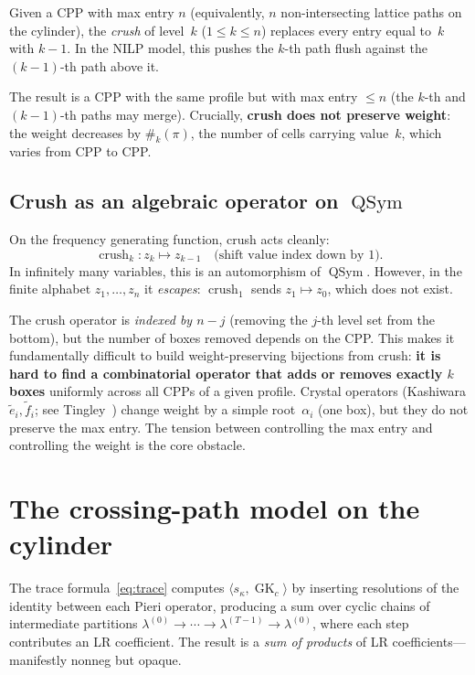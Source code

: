 \documentclass[11pt]{article}
\theoremstyle{plain}
\theoremstyle{definition}
\theoremstyle{remark}
\newcommand{\GK}{\operatorname{GK}}
\newcommand{\QSym}{\operatorname{QSym}}
\begin{document}
Given a CPP with max entry $n$ (equivalently, $n$ non-intersecting
lattice paths on the cylinder), the \emph{crush} of level~$k$
($1 \leq k \leq n$) replaces every entry equal to~$k$ with $k-1$.
In the NILP model, this pushes the $k$-th path flush against
the $(k-1)$-th path above it.

The result is a CPP with the same profile but with max entry
$\leq n$ (the $k$-th and $(k-1)$-th paths may merge).
Crucially, \textbf{crush does not preserve weight}: the weight
decreases by $\#_k(\pi)$, the number of cells carrying value~$k$,
which varies from CPP to CPP.

\subsection{Crush as an algebraic operator on $\QSym$}

On the frequency generating function, crush acts cleanly:
\[
  \operatorname{crush}_k : z_k \mapsto z_{k-1}
  \quad\text{(shift value index down by 1)}.
\]
In infinitely many variables, this is an automorphism of $\QSym$.
However, in the finite alphabet $z_1, \ldots, z_n$ it
\emph{escapes}: $\operatorname{crush}_1$ sends $z_1 \mapsto z_0$,
which does not exist.

The crush operator is \emph{indexed by $n - j$} (removing
the $j$-th level set from the bottom), but the number of boxes
removed depends on the CPP. This makes it fundamentally
difficult to build weight-preserving bijections from crush:
\textbf{it is hard to find a combinatorial operator that adds
or removes exactly $k$ boxes} uniformly across all CPPs of a
given profile. Crystal operators (Kashiwara
$\tilde{e}_i, \tilde{f}_i$; see Tingley~\cite{tingley-2007})
change weight by a simple root~$\alpha_i$ (one box), but they
do not preserve the max entry. The tension between controlling
the max entry and controlling the weight is the core obstacle.


\section{The crossing-path model on the cylinder}
\label{sec:crossing-paths}


The trace formula~\eqref{eq:trace} computes
$\langle s_\kappa, \GK_c \rangle$ by inserting resolutions of the
identity between each Pieri operator, producing a sum over cyclic
chains of intermediate partitions
$\lambda^{(0)} \to \cdots \to \lambda^{(T-1)} \to \lambda^{(0)}$,
where each step contributes an LR coefficient.
The result is a \emph{sum of products} of LR coefficients---manifestly
nonneg but opaque.
\end{document}
